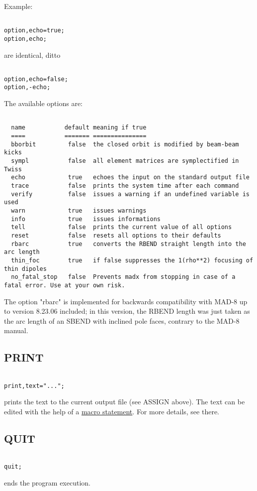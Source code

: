  Example: 
\begin{verbatim}

option,echo=true;
option,echo;
\end{verbatim} 
are identical, ditto 
\begin{verbatim}

option,echo=false;
option,-echo;
\end{verbatim} 
The available options are: 
\begin{verbatim}

  name           default meaning if true
  ====           ======= ===============
  bborbit         false  the closed orbit is modified by beam-beam kicks
  sympl           false  all element matrices are symplectified in Twiss
  echo            true   echoes the input on the standard output file
  trace           false  prints the system time after each command
  verify          false  issues a warning if an undefined variable is used
  warn            true   issues warnings
  info            true   issues informations
  tell            false  prints the current value of all options
  reset           false  resets all options to their defaults
  rbarc           true   converts the RBEND straight length into the arc length
  thin_foc        true   if false suppresses the 1(rho**2) focusing of thin dipoles
  no_fatal_stop   false  Prevents madx from stopping in case of a fatal error. Use at your own risk.
\end{verbatim} 
The option "rbarc" is implemented for backwards compatibility with MAD-8
up to version 8.23.06 included; in this version, the RBEND length was
just taken as the arc length of an SBEND with inclined pole faces,
contrary to the MAD-8 manual.  


\subsection{PRINT}
\begin{verbatim}

print,text="...";
\end{verbatim} 
prints the text to the current output file (see ASSIGN above). The text
can be edited with the help of a  \href{special.html#macro}{macro
  statement}. For more details, see there.  


\subsection{QUIT}
\begin{verbatim}

quit;
\end{verbatim} 
ends the program execution. 


